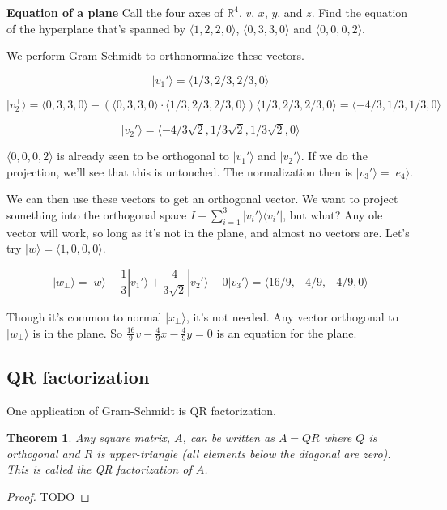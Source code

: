 \documentclass{amsbook}
\newtheorem{theorem}{Theorem}
\begin{document}
\begin{tcolorbox}[title=Example,colback=blue!5]
  {\bfseries\Large Equation of a plane}
Call the four axes of $\mathbb R^4$, $v$, $x$, $y$, and $z$.  Find the equation of the hyperplane that's spanned by $\langle 1,2,2,0\rangle$, $\langle 0,3,3,0\rangle$ and $\langle 0,0,0,2\rangle$.

We perform Gram-Schmidt to orthonormalize these vectors.

$$
|v_1'\rangle=\langle 1/3, 2/3, 2/3, 0\rangle
$$

$$
|v_2^\bot\rangle=\langle 0,3,3,0\rangle-\left(\langle 0,3,3,0\rangle\cdot\langle 1/3, 2/3, 2/3,0\rangle\right)\langle 1/3, 2/3, 2/3,0\rangle=\langle -4/3, 1/3, 1/3, 0\rangle
$$

$$
|v_2'\rangle=\langle -4/3\sqrt2, 1/3\sqrt2, 1/3\sqrt2, 0\rangle
$$

$\langle 0,0,0,2\rangle$ is already seen to be orthogonal to $|v_1'\rangle$ and $|v_2'\rangle$.  If we do the projection, we'll see that this is untouched.  The normalization then is $|v_3'\rangle=|e_4\rangle$.

We can then use these vectors to get an orthogonal vector.  We want to project something into the orthogonal space $I-\sum_{i=1}^3|v_i'\rangle\langle v_i'|$, but what?  Any ole vector will work, so long as it's not in the plane, and almost no vectors are.  Let's try $|w\rangle=\langle 1,0,0,0\rangle$.

$$
|w_\bot\rangle=|w\rangle-\frac{1}{3}|v_1'\rangle+\frac{4}{3\sqrt2}|v_2'\rangle-0|v_3'\rangle=\langle 16/9, -4/9, -4/9, 0\rangle
$$

Though it's common to normal $|x_\bot\rangle$, it's not needed.  Any vector orthogonal to $|w_\bot\rangle$ is in the plane.  So $\frac{16}{9}v-\frac{4}{9}x-\frac{4}{9}y=0$ is an equation for the plane.
\end{tcolorbox}

\subsection{QR factorization}
One application of Gram-Schmidt is QR factorization.

\begin{theorem}
Any square matrix, $A$, can be written as $A=QR$ where $Q$ is orthogonal and $R$ is upper-triangle (all elements below the diagonal are zero).  This is called the {\em QR factorization} of $A$.
\end{theorem}

\begin{proof}
  TODO
\end{proof}
\end{document}
